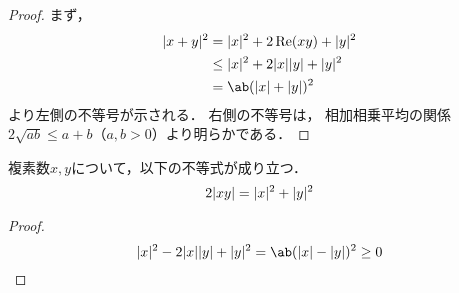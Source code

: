 \documentclass[../sotsu.tex]{subfiles}
\begin{document}
\begin{proof}
    まず，
    \begin{equation*}
        \begin{split}
            \abs{x + y}^2
                &= \abs{x}^2 + 2\Real (xy) + \abs{y}^2    \\
                &\leq \abs{x}^2 + 2 \abs{x} \abs{y} + \abs{y}^2  \\
                &= \ab( \abs{x} + \abs{y} )^2
        \end{split}
    \end{equation*}
    より左側の不等号が示される．
    右側の不等号は，
    相加相乗平均の関係$2\sqrt{ab} \leq a + b$（$a, b > 0$）より明らかである．
\end{proof}


\begin{corollary}
    \label{thm:complex-abs-product-inequality}
    複素数$x, y$について，以下の不等式が成り立つ．
    \begin{equation}
        \label{eq:complex-abs-product-inequality}
        2\lvert xy\rvert = \lvert x\rvert^2 + \lvert y\rvert^2
    \end{equation}
\end{corollary}

\begin{proof}
    \begin{equation*}
        \abs{x}^2 -2 \abs{x} \abs{y} + \abs{y}^2
            = \ab( \abs{x} - \abs{y} )^2
            \geq 0
    \end{equation*}
\end{proof}
\end{document}
